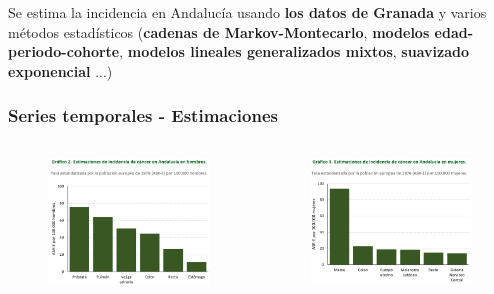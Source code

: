 \documentclass{beamer}
\begin{document}
\begin{frame}
	\centering
	Se estima la incidencia en Andalucía usando \textbf{los datos de Granada} y varios métodos estadísticos (\textbf{cadenas de Markov-Montecarlo}, \textbf{modelos edad-periodo-cohorte}, \textbf{modelos lineales generalizados mixtos}, \textbf{suavizado exponencial} ...)
\end{frame}


\begin{frame}\frametitle{Series temporales - Estimaciones}
	\begin{columns}
		\begin{column}{0.5\textwidth}
			\begin{figure}
				\centering
				\includegraphics[width=\textwidth]{images/estimaciones_hombres.png}
			\end{figure}
		\end{column}
		\begin{column}{0.5\textwidth}
			\begin{figure}
				\centering
				\includegraphics[width=\textwidth]{images/estimaciones_mujeres.png}

\end{figure}
\end{column}
\end{columns}
\end{frame}
\end{document}
